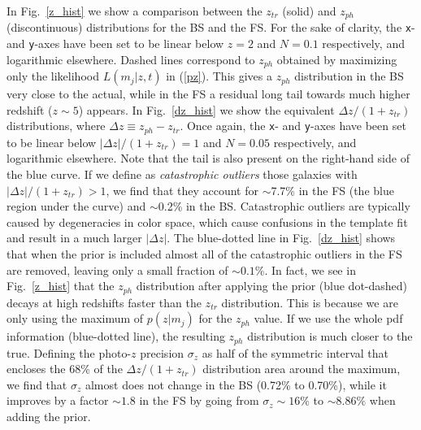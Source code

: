In Fig.~\ref{z_hist} we show a comparison between the $z_{tr}$ (solid) and $z_{ph}$ (discontinuous) distributions for the BS and the FS. For the sake of clarity, the \texttt{x}- and \texttt{y}-axes have been set to be linear below $z=2$ and $N=0.1$ respectively, and logarithmic elsewhere. Dashed lines correspond to $z_{ph}$ obtained by maximizing only the likelihood $L(m_j|z,t)$ in (\ref{pz}). This gives a $z_{ph}$ distribution in the BS very close to the actual, while in the FS a residual long tail towards much higher redshift ($z\sim5$) appears. In Fig.~\ref{dz_hist} we show the equivalent $\Delta z / (1+z_{tr})$ distributions, where $ \Delta z \equiv z_{ph} - z_{tr}$. Once again, the \texttt{x}- and \texttt{y}-axes have been set to be linear below $|\Delta z| / (1+z_{tr})=1$ and $N=0.05$ respectively, and logarithmic elsewhere. Note that the tail is also present on the right-hand side of the blue curve. If we define as \textit{catastrophic outliers} those galaxies with $|\Delta z| / (1+z_{tr}) > 1$, we find that they account for $\sim$7.7\% in the FS (the blue region under the curve) and $\sim$0.2\% in the BS. Catastrophic outliers are typically caused by degeneracies in color space, which cause confusions in the template fit and result in a much larger $|\Delta z|$. The blue-dotted line in Fig.~\ref{dz_hist} shows that when the prior is included almost all of the catastrophic outliers in the FS are removed, leaving only a small fraction of $\sim0.1\%$. In fact, we see in Fig.~\ref{z_hist} that the $z_{ph}$ distribution after applying the prior (blue dot-dashed) decays at high redshifts faster than the $z_{tr}$ distribution. This is because we are only using the maximum of $p(z|m_j)$ for the $z_{ph}$ value. If we use the whole pdf information (blue-dotted line), the resulting $z_{ph}$ distribution is much closer to the true. Defining the photo-$z$ precision $\sigma_z$ as half of the symmetric interval that encloses the 68\% of the $\Delta z /(1+z_{tr})$ distribution area around the maximum, we find that $\sigma_z$ almost does not change in the BS (0.72\% to 0.70\%), while it improves by a factor $\sim1.8$ in the FS by going from $\sigma_z\sim16\%$ to $\sim8.86\%$ when adding the prior. 

